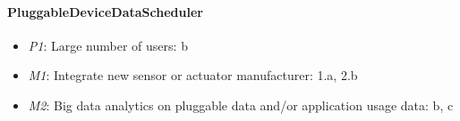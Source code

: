     \paragraph{PluggableDeviceDataScheduler}
        \begin{itemize}
            \item \emph{P1}: Large number of users: b
            \item \emph{M1}: Integrate new sensor or actuator manufacturer: 1.a, 2.b
            \item \emph{M2}: Big data analytics on pluggable data and/or application usage data: b, c
        \end{itemize}
